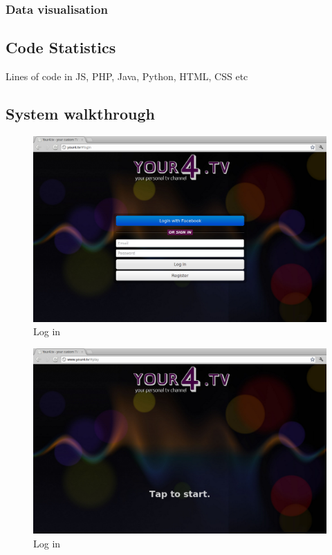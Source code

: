 \subsubsection{Data visualisation}


\subsection{Code Statistics}
Lines of code in JS, PHP, Java, Python, HTML, CSS etc

\subsection{System walkthrough}
\begin{figure}[th]
	\centering
	\includegraphics[width=\textwidth]{images/screenshots/your4-login.png}
	\caption{Log in}
	\label{fig:your4-login}
\end{figure}
\begin{figure}[th]
	\centering
	\includegraphics[width=\textwidth]{images/screenshots/your4-tap-to-start.png}
	\caption{Log in}
	\label{fig:your4-tap-to-start}
\end{figure}
